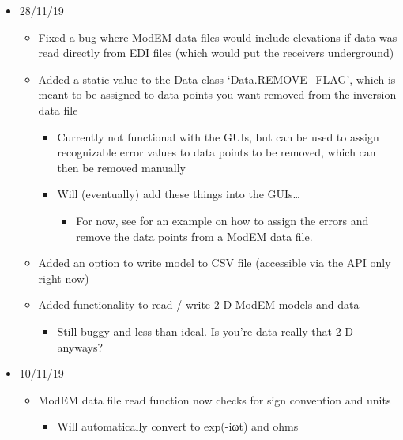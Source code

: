 \documentclass[letterpaper,10pt,english]{sphinxmanual}
\begin{document}
\begin{itemize}
\begin{itemize}
\end{itemize}

\item {} 
28/11/19
\begin{itemize}
\item {} 
Fixed a bug where ModEM data files would include elevations if data was read directly from EDI files (which would put the receivers underground)

\item {} 
Added a static value to the Data class ‘Data.REMOVE\_FLAG’, which is meant to be assigned to data points you want removed from the inversion data file
\begin{itemize}
\item {} 
Currently not functional with the GUIs, but can be used to assign recognizable error values to data points to be removed, which can then be removed manually

\item {} 
Will (eventually) add these things into the GUIs…
\begin{itemize}
\item {} 
For now, see {\hyperref[\detokenize{content/examples/recipes:recipes}]{}} for an example on how to assign the errors and remove the data points from a ModEM data file.

\end{itemize}

\end{itemize}

\item {} 
Added an option to write model to CSV file (accessible via the API only right now)

\item {} 
Added functionality to read / write 2-D ModEM models and data
\begin{itemize}
\item {} 
Still buggy and less than ideal. Is you’re data really that 2-D anyways?

\end{itemize}

\end{itemize}

\item {} 
10/11/19
\begin{itemize}
\item {} 
ModEM data file read function now checks for sign convention and units
\begin{itemize}
\item {} 
Will automatically convert to exp(-iωt) and ohms


\end{itemize}
\end{itemize}
\end{itemize}
\end{document}
